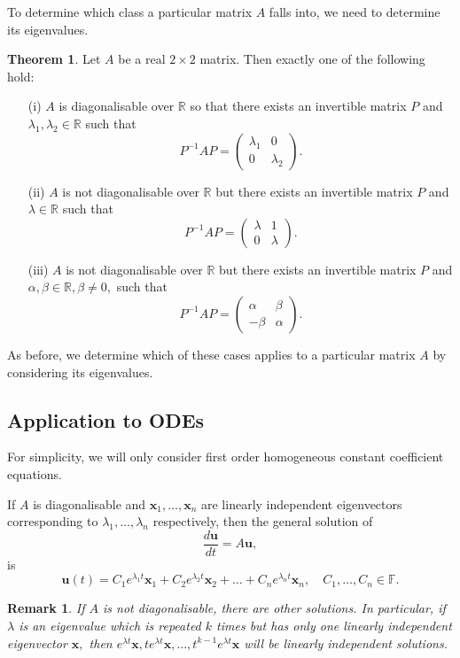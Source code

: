 \documentclass[12pt, a4paper]{article}
\newtheorem*{remark}{Remark}
\theoremstyle{definition}
\newtheorem{theorem}{Theorem}[section]
\theoremstyle{plain}
\newcommand{\bb}[1]{\mathbb{#1}}
\newcommand{\vect}[1]{\mathbf{#1}}
\begin{document}
To determine which class a particular matrix $A$ falls into, we need to determine its eigenvalues.

\begin{theorem}
Let $A$ be a real $2 \times 2$ matrix. Then exactly one of the following hold: 
\begin{enumerate}
	
	\item[(i)] $A$ is diagonalisable over $\bb{R}$ so that there exists an invertible matrix $P$ and $\lambda_1,\lambda_2 \in \bb{R}$ such that $$P^{-1}AP=\begin{pmatrix} \lambda_1 & 0 \\ 0 & \lambda_2 \end{pmatrix}.$$

	\item[(ii)] $A$ is not diagonalisable over $\bb{R}$ but there exists an invertible matrix $P$ and $\lambda \in \bb{R}$ such that $$P^{-1}AP=\begin{pmatrix} \lambda & 1 \\ 0 & \lambda \end{pmatrix}.$$

	\item[(iii)] $A$ is not diagonalisable over $\bb{R}$ but there exists an invertible matrix $P$ and $\alpha, \beta \in \bb{R}, \beta \neq 0,$ such that $$P^{-1}AP=\begin{pmatrix} \alpha & \beta \\ -\beta & \alpha \end{pmatrix}.$$

\end{enumerate}
\end{theorem}

As before, we determine which of these cases applies to a particular matrix $A$ by considering its eigenvalues. 

\subsection{Application to ODEs}

For simplicity, we will only consider first order homogeneous constant coefficient equations.

\begin{tcolorbox}
If $A$ is diagonalisable and $\vect{x}_1,\ldots, \vect{x}_n$ are linearly independent eigenvectors corresponding to $\lambda_1,\ldots, \lambda_n$ respectively, then the general solution of $$\frac{d\vect{u}}{dt}=A\vect{u},$$ is $$\vect{u}(t)=C_1e^{\lambda_1t}\vect{x}_1 +C_2e^{\lambda_2t}\vect{x}_2 +\ldots+C_ne^{\lambda_nt}\vect{x}_n, \quad C_1,\ldots,C_n \in \bb{F}.$$
\end{tcolorbox}

\begin{remark}
If $A$ is not diagonalisable, there are other solutions. In particular, if $\lambda$ is an eigenvalue which is repeated $k$ times but has only one linearly independent eigenvector $\vect{x},$ then $e^{\lambda t}\vect{x}, te^{\lambda t}\vect{x},\ldots, t^{k-1}e^{\lambda t}\vect{x}$ will be linearly independent solutions.
\end{remark}
\end{document}
